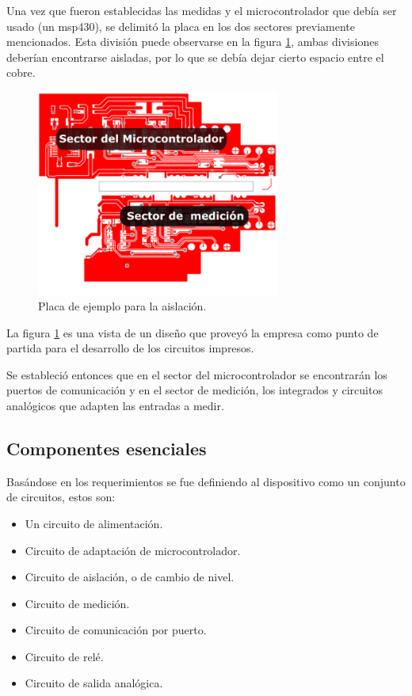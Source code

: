 Una vez que fueron establecidas las medidas y el microcontrolador que debía ser usado (un msp430), se delimitó la placa en los dos sectores previamente mencionados. Esta división puede observarse en la figura \ref{fig:pcbbase}, ambas divisiones deberían encontrarse aisladas, por lo que se debía dejar cierto espacio entre el cobre.

\begin{figure}[h]
	\centering
	\includegraphics[width=80mm,keepaspectratio]{Figures/esquema22.png}
	\caption{Placa de ejemplo para la aislación.}
	\label{fig:pcbbase}
\end{figure}



La figura \ref{fig:pcbbase} es una vista de un diseño que proveyó la empresa como punto de partida para el desarrollo de los circuitos impresos.

Se estableció entonces que en el sector del microcontrolador se encontrarán los puertos de comunicación y en el sector de medición, los integrados y circuitos analógicos que adapten las entradas a medir.

\subsection{Componentes esenciales}

Basándose en los requerimientos se fue definiendo al dispositivo como  un conjunto de circuitos, estos son:

\begin{itemize}
\item Un circuito de alimentación.
\item Circuito de adaptación de microcontrolador.
\item Circuito de aislación, o de cambio de nivel.
\item Circuito de medición.
\item Circuito de comunicación por puerto.
\item Circuito de relé.
\item Circuito de salida analógica.
\end{itemize}


